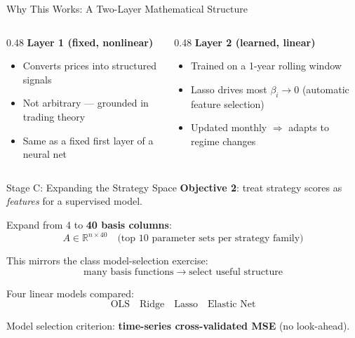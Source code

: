 \documentclass[aspectratio=169]{beamer}
\begin{document}
\begin{frame}{Why This Works: A Two-Layer Mathematical Structure}
  \vspace{0.3em}
  \begin{columns}[T]
    \begin{column}{0.48\textwidth}
      \textbf{Layer 1 (fixed, nonlinear)}
      \begin{itemize}\small
        \item Converts prices into structured signals
        \item Not arbitrary — grounded in trading theory
        \item Same as a fixed first layer of a neural net
      \end{itemize}
    \end{column}
    \begin{column}{0.48\textwidth}
      \textbf{Layer 2 (learned, linear)}
      \begin{itemize}\small
        \item Trained on a 1-year rolling window
        \item Lasso drives most $\beta_i \to 0$ (automatic feature selection)
        \item Updated monthly $\Rightarrow$ adapts to regime changes
      \end{itemize}
    \end{column}
  \end{columns}
\end{frame}

\begin{frame}{Stage C: Expanding the Strategy Space}
  \textbf{Objective 2}: treat strategy scores as \emph{features} for a supervised model.

  \vspace{0.4em}
  Expand from 4 to \textbf{40 basis columns}:
  \[
    A \in \mathbb{R}^{n \times 40}
    \quad \text{(top 10 parameter sets per strategy family)}
  \]

  \vspace{0.3em}
  This mirrors the class model-selection exercise:
  \[
    \text{many basis functions} \;\longrightarrow\; \text{select useful structure}
  \]

  \vspace{0.4em}
  Four linear models compared:
  \[
    \text{OLS} \quad \text{Ridge} \quad \text{Lasso} \quad \text{Elastic Net}
  \]

  \vspace{0.3em}
  Model selection criterion: \textbf{time-series cross-validated MSE} (no look-ahead).
\end{frame}
\end{document}
